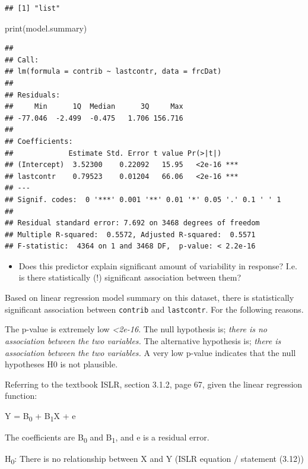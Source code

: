 \documentclass[
]{article}
\newenvironment{Shaded}{\begin{snugshade}}{\end{snugshade}}
\newcommand{\FunctionTok}[1]{\textcolor[rgb]{0.00,0.00,0.00}{#1}}
\newcommand{\NormalTok}[1]{#1}
\providecommand{\tightlist}{%
  \setlength{\itemsep}{0pt}\setlength{\parskip}{0pt}}
\begin{document}
\begin{verbatim}
## [1] "list"
\end{verbatim}

\begin{Shaded}
\begin{Highlighting}[]
\FunctionTok{print}\NormalTok{(model.summary)}
\end{Highlighting}
\end{Shaded}

\begin{verbatim}
## 
## Call:
## lm(formula = contrib ~ lastcontr, data = frcDat)
## 
## Residuals:
##     Min      1Q  Median      3Q     Max 
## -77.046  -2.499  -0.475   1.706 156.716 
## 
## Coefficients:
##             Estimate Std. Error t value Pr(>|t|)    
## (Intercept)  3.52300    0.22092   15.95   <2e-16 ***
## lastcontr    0.79523    0.01204   66.06   <2e-16 ***
## ---
## Signif. codes:  0 '***' 0.001 '**' 0.01 '*' 0.05 '.' 0.1 ' ' 1
## 
## Residual standard error: 7.692 on 3468 degrees of freedom
## Multiple R-squared:  0.5572, Adjusted R-squared:  0.5571 
## F-statistic:  4364 on 1 and 3468 DF,  p-value: < 2.2e-16
\end{verbatim}

\begin{itemize}
\tightlist
\item
  Does this predictor explain significant amount of variability in
  response? I.e. is there statistically (!) significant association
  between them?
\end{itemize}

Based on linear regression model summary on this dataset, there is
statistically significant association between \texttt{contrib} and
\texttt{lastcontr}. For the following reasons.

The p-value is extremely low \emph{\textless2e-16}. The null hypothesis
is; \emph{there is no association between the two variables.} The
alternative hypothesis is; \emph{there is association between the two
variables.} A very low p-value indicates that the null hypotheses H0 is
not plausible.

Referring to the textbook ISLR, section 3.1.2, page 67, given the linear
regression function:

Y = B\textsubscript{0} + B\textsubscript{1}X + e

The coefficients are B\textsubscript{0} and B\textsubscript{1}, and e is
a residual error.

H\textsubscript{0}: There is no relationship between X and Y (ISLR
equation / statement (3.12))
\end{document}
